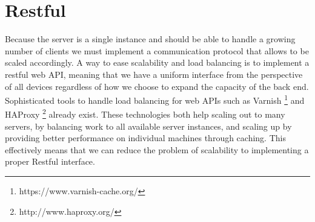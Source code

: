 
\section{Restful}
Because the server is a single instance and should be able to handle a growing number of clients we must implement a communication protocol that allows to be scaled accordingly. A way to ease scalability and load balancing is to implement a restful web API, meaning that we have a uniform interface from the perspective of all devices regardless of how we choose to expand the capacity of the back end. Sophisticated tools to handle load balancing for web APIs such as Varnish \footnote{https://www.varnish-cache.org/} and HAProxy \footnote{http://www.haproxy.org/} already exist. These technologies both help scaling out to many servers, by balancing work to all available server instances, and scaling up by providing better performance on individual machines through caching. This effectively means that we can reduce the problem of scalability to implementing a proper Restful interface. 

